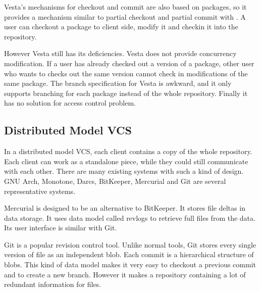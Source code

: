 Vesta's mechanisms for checkout and commit are also based on packages, so it
provides a mechanism similar to partial checkout and partial commit with \sys.
A user can checkout a package to client side, modify it and checkin it into the
repository.

However Vesta still has its deficiencies. Vesta does not provide concurrency
modification. If a user has already checked out a version of a package, other
user who wants to checks out the same version cannot check in modifications of the
same package. The branch specification for Vesta is awkward, and it only
supports branching for each package instead of the whole repository. Finally it
has no solution for access control problem.

\subsection{Distributed Model VCS}

In a distributed model VCS, each client contains a copy of the whole repository.
Each client can work as a standalone piece, while they could still communicate
with each other. There are many existing systems with such a kind of design.
GNU Arch\cite{gnuarch}, Monotone\cite{monotone}, Darcs\cite{darcs},
BitKeeper\cite{bitkeeper}, Mercurial\cite{mercurial} and Git\cite{git} are
several representative systems.

Mercurial is designed to be an alternative to BitKeeper. It stores file deltas
in data storage. It uses data model called revlogs\cite{mackall06mercurial} to
retrieve full files from the data. Its user interface is similar with Git.

Git\cite{git} is a popular revision control tool. Unlike normal tools, Git
stores every single version of file as an independent blob. Each commit is a
hierarchical structure of blobs. This kind of data model makes it very easy to
checkout a previous commit and to create a new branch. However it makes a
repository containing a lot of redundant information for files.




